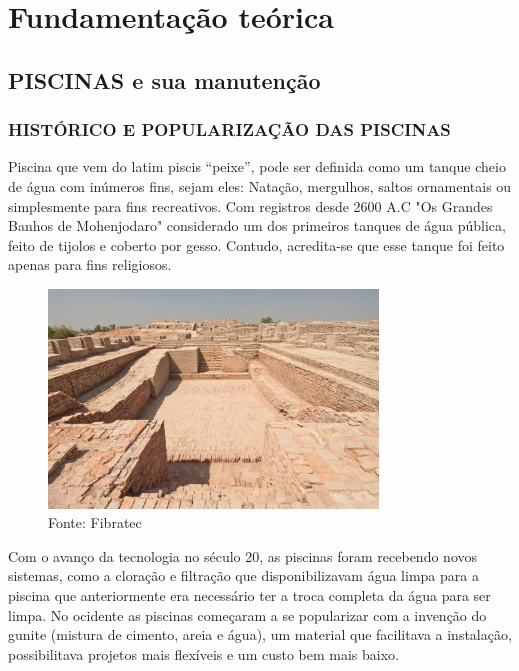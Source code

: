\chapter{Fundamentação teórica}

\section{PISCINAS e sua manutenção}

    \subsection{HISTÓRICO E POPULARIZAÇÃO DAS PISCINAS}
    
        Piscina que vem do latim piscis “peixe”, pode ser definida como um tanque cheio de água com inúmeros fins, sejam eles: Natação, mergulhos, saltos ornamentais ou simplesmente para fins recreativos\cite{piscinaOquee}. Com registros desde 2600 A.C "Os Grandes Banhos de Mohenjodaro" considerado um dos primeiros tanques de água pública, feito de tijolos e coberto por gesso. Contudo, acredita-se que esse tanque foi feito apenas para fins religiosos.
         \begin{figure}[H]
         	\centering
         	\caption{ }  
        	\centering
         	\label{fig:cont}
        	\includegraphics[width=0.78\textwidth]{imagens/primeiraPiscina.png}
        	\caption*{Fonte: Fibratec}
         \end{figure}
        
        Com o avanço da tecnologia no século 20, as piscinas foram recebendo novos sistemas, como a cloração e filtração que disponibilizavam água limpa para a piscina que anteriormente era necessário ter a troca completa da água para ser limpa. No ocidente as piscinas começaram a se popularizar com a invenção do gunite (mistura de cimento, areia e água), um material que facilitava a instalação, possibilitava projetos mais flexíveis e um custo bem mais baixo\cite{piscinaHistoria}.

